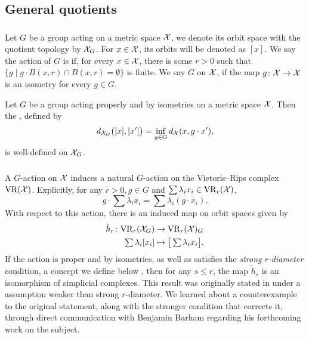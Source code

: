 
\subsection{General quotients}

\subsubsection{}

Let $G$ be a group acting on a metric space $\mathcal{X}$, we denote its orbit space with the quotient topology by $\mathcal{X}_G$.
For $x \in \mathcal{X}$, its orbits will be denoted as $[x]$.
We say the action of $G$ is  if, for every $x \in \mathcal{X}$, there is some $r>0$ such that $\{g \mid g\cdot B(x,r) \cap B(x,r) = \emptyset\}$ is finite.
We say $G$  on $\mathcal{X}$, if the map $g \colon \mathcal{X} \to \mathcal{X}$ is an isometry for every $g \in G$.

Let $G$ be a group acting properly and by isometries on a metric space $\mathcal{X}$.
Then the , defined by
\[
d_{\mathcal{X}_G}\big([x], [x']\big) = \inf_{g \in G} d_{\mathcal{X}}(x, g \cdot x'),
\]
is well-defined on $\mathcal{X}_G$.

\subsubsection{}\label{ss:h}

A \(G\)-action on $\mathcal{X}$ induces a natural \(G\)-action on the Vietoris--Rips complex $\mathrm{VR}(\mathcal{X})$.
Explicitly, for any \(r > 0, g\in G\) and $\sum \lambda_i x_i \in \mathrm{VR}_r(\mathcal{X})$,
\[
g \cdot \sum \lambda_i x_i = \sum \lambda_i (g\cdot x_i).
\]
With respect to this action, there is an induced map on orbit spaces given by
\begin{align*}
	\tilde h_r \colon \mathrm{VR}_r(\mathcal{X}_G) &\to \mathrm{VR}_r(\mathcal{X})_G \\
	\textstyle\sum\lambda_i [x_i] &\mapsto \textstyle \big[\sum\lambda_i x_i\big].
\end{align*}
If the action is proper and by isometries, as well as satisfies the \textit{strong \(r\)-diameter} condition, a concept we define below , then for any \(s \leq r\), the map $\tilde{h}_s$ is an isomorphism of simplicial complexes.
This result was originally stated in \cite[Prop.~3.5]{adams2022metric} under a assumption weaker than strong \(r\)-diameter.
We learned about a counterexample to the original statement, along with the stronger condition that corrects it, through direct communication with Benjamin Barham regarding his forthcoming work on the subject.

